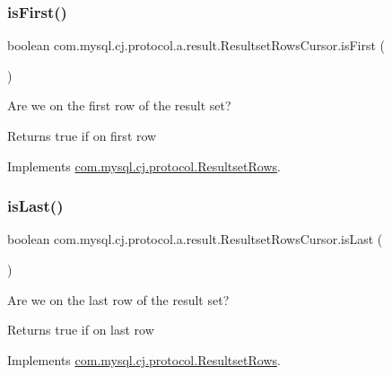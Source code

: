 \subsubsection{\texorpdfstring{is\+First()}{isFirst()}}
{\footnotesize\ttfamily boolean com.\+mysql.\+cj.\+protocol.\+a.\+result.\+Resultset\+Rows\+Cursor.\+is\+First (\begin{DoxyParamCaption}{ }\end{DoxyParamCaption})}

Are we on the first row of the result set?

\begin{DoxyReturn}{Returns}
true if on first row 
\end{DoxyReturn}


Implements \mbox{\hyperlink{interfacecom_1_1mysql_1_1cj_1_1protocol_1_1_resultset_rows_ae7d5b7ca8787eaca7ee5e0ca69ac2818}{com.\+mysql.\+cj.\+protocol.\+Resultset\+Rows}}.

\mbox{\label{classcom_1_1mysql_1_1cj_1_1protocol_1_1a_1_1result_1_1_resultset_rows_cursor_ae16f7cc758e2518a8cf1c6acfddeed10}} 
\subsubsection{\texorpdfstring{is\+Last()}{isLast()}}
{\footnotesize\ttfamily boolean com.\+mysql.\+cj.\+protocol.\+a.\+result.\+Resultset\+Rows\+Cursor.\+is\+Last (\begin{DoxyParamCaption}{ }\end{DoxyParamCaption})}

Are we on the last row of the result set?

\begin{DoxyReturn}{Returns}
true if on last row 
\end{DoxyReturn}


Implements \mbox{\hyperlink{interfacecom_1_1mysql_1_1cj_1_1protocol_1_1_resultset_rows_ae52ab20020adafaf87c2f45bae82980d}{com.\+mysql.\+cj.\+protocol.\+Resultset\+Rows}}.

\mbox{\label{classcom_1_1mysql_1_1cj_1_1protocol_1_1a_1_1result_1_1_resultset_rows_cursor_af4a1433311e5089d29b554c81d0b006c}} 
